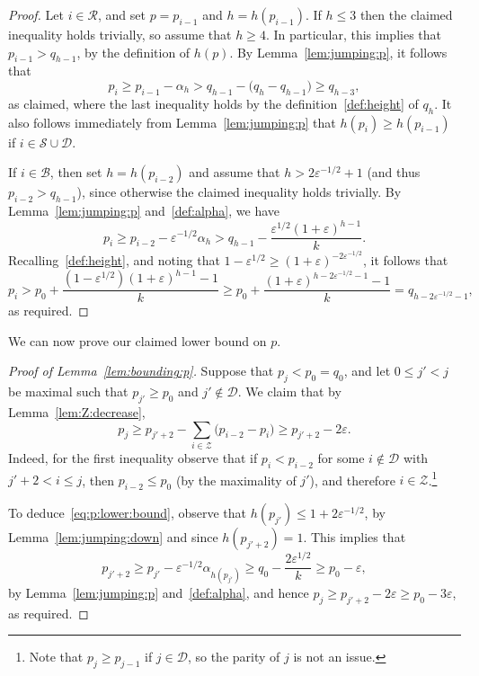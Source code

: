 \documentclass[12pt,reqno]{amsart}
\theoremstyle{definition}
\theoremstyle{remark}
\newcommand\cB{\mathcal{B}}
\newcommand\cZ{\mathcal{Z}}
\def\cS{\mathcal{S}}
\newcommand\eps{\varepsilon}
\renewcommand{\le}{\leqslant}
\renewcommand{\ge}{\geqslant}
\def\eps{\varepsilon}
\def\cD{\mathcal{D}}
\def\cR{\mathcal{R}}
\def\cB{\mathcal{B}}
\begin{document}
\begin{proof}
Let $i \in \cR$, and set $p = p_{i-1}$ and $h = h(p_{i-1})$. If $h \le 3$ then the claimed inequality holds trivially, so assume that $h \ge 4$. In particular, this implies that $p_{i-1} > q_{h-1}$, by the definition of $h(p)$. By Lemma~\ref{lem:jumping:p}, it follows that
$$p_i \ge p_{i-1} - \alpha_h > q_{h-1} - \big( q_h - q_{h - 1} \big) \ge q_{h-3},$$  
as claimed, %
where the last inequality holds by the definition~\eqref{def:height} of $q_h$. It also follows immediately from Lemma~\ref{lem:jumping:p} that $h(p_i) \ge h(p_{i-1})$ if $i \in \cS \cup \cD$.

\pagebreak

If $i \in \cB$, then set $h = h(p_{i-2})$ and assume that $h > 2\eps^{-1/2} + 1$ (and thus $p_{i-2} > q_{h-1}$), since otherwise the claimed inequality holds trivially. By Lemma~\ref{lem:jumping:p} and~\eqref{def:alpha}, we have
$$p_i \ge p_{i-2} - \eps^{-1/2} \alpha_h > q_{h-1} - \frac{\eps^{1/2}(1+\eps)^{h-1}}{k}.$$
Recalling~\eqref{def:height}, and noting that $1 - \eps^{1/2} \ge (1+\eps)^{- 2\eps^{-1/2}}$, it follows that 
\begin{equation}\label{eq:Step1:bound}
p_i > p_0 + \frac{(1 - \eps^{1/2})(1+\eps)^{h - 1} - 1}{k} \ge p_0 + \frac{(1+\eps)^{h - 2\eps^{-1/2} - 1} - 1}{k} = q_{h-2\eps^{-1/2} - 1},
\end{equation}
as required.
\end{proof}

We can now prove our claimed lower bound on $p$. 

\begin{proof}[Proof of Lemma~\ref{lem:bounding:p}]
Suppose that $p_j < p_0 = q_0$, and let $0 \le j' < j$ be maximal such that $p_{j'} \ge p_0$ and $j' \not\in \cD$. We claim that by Lemma~\ref{lem:Z:decrease}, 
$$p_j \ge p_{j'+2} - \sum_{i \in \cZ} \big( p_{i-2} - p_{i} \big) \ge p_{j'+2} - 2\eps.$$
Indeed, for the first inequality observe that if $p_i < p_{i-2}$ for some $i \not\in \cD$ with $j' + 2 < i \le j$, then $p_{i-2} \le p_0$ (by the maximality of $j'$), and therefore $i \in \cZ$.\footnote{Note that $p_j \ge p_{j-1}$ if $j \in \cD$, so the parity of $j$ is not an issue.} 

To deduce~\eqref{eq:p:lower:bound}, observe that $h(p_{j'}) \le 1 + 2 \eps^{-1/2}$, by Lemma~\ref{lem:jumping:down} and since $h(p_{j'+2}) = 1$. This implies that 
$$p_{j'+2} \ge p_{j'} - \eps^{-1/2} \alpha_{h(p_{j'})} \ge q_0 - \frac{2\eps^{1/2}}{k} \ge p_0 - \eps,$$
by Lemma~\ref{lem:jumping:p} and~\eqref{def:alpha}, and hence $p_j \ge p_{j'+2} - 2\eps \ge p_0 - 3\eps$, as required.
\end{proof}
\end{document}
